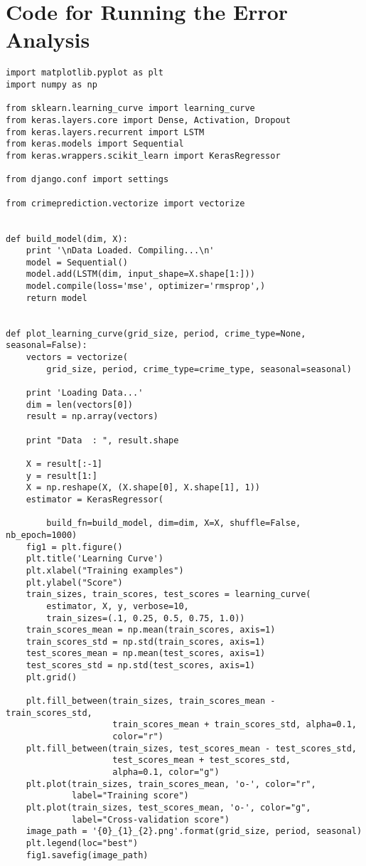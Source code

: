 \chapter{Code for Running the Error Analysis} \label{code-error-analysis}
\begin{small}
\begin{verbatim}
import matplotlib.pyplot as plt
import numpy as np

from sklearn.learning_curve import learning_curve
from keras.layers.core import Dense, Activation, Dropout
from keras.layers.recurrent import LSTM
from keras.models import Sequential
from keras.wrappers.scikit_learn import KerasRegressor

from django.conf import settings

from crimeprediction.vectorize import vectorize


def build_model(dim, X):
    print '\nData Loaded. Compiling...\n'
    model = Sequential()
    model.add(LSTM(dim, input_shape=X.shape[1:]))
    model.compile(loss='mse', optimizer='rmsprop',)
    return model


def plot_learning_curve(grid_size, period, crime_type=None, seasonal=False):
    vectors = vectorize(
        grid_size, period, crime_type=crime_type, seasonal=seasonal)

    print 'Loading Data...'
    dim = len(vectors[0])
    result = np.array(vectors)

    print "Data  : ", result.shape

    X = result[:-1]
    y = result[1:]
    X = np.reshape(X, (X.shape[0], X.shape[1], 1))
    estimator = KerasRegressor(

        build_fn=build_model, dim=dim, X=X, shuffle=False, nb_epoch=1000)
    fig1 = plt.figure()
    plt.title('Learning Curve')
    plt.xlabel("Training examples")
    plt.ylabel("Score")
    train_sizes, train_scores, test_scores = learning_curve(
        estimator, X, y, verbose=10,
        train_sizes=(.1, 0.25, 0.5, 0.75, 1.0))
    train_scores_mean = np.mean(train_scores, axis=1)
    train_scores_std = np.std(train_scores, axis=1)
    test_scores_mean = np.mean(test_scores, axis=1)
    test_scores_std = np.std(test_scores, axis=1)
    plt.grid()

    plt.fill_between(train_sizes, train_scores_mean - train_scores_std,
                     train_scores_mean + train_scores_std, alpha=0.1,
                     color="r")
    plt.fill_between(train_sizes, test_scores_mean - test_scores_std,
                     test_scores_mean + test_scores_std,
                     alpha=0.1, color="g")
    plt.plot(train_sizes, train_scores_mean, 'o-', color="r",
             label="Training score")
    plt.plot(train_sizes, test_scores_mean, 'o-', color="g",
             label="Cross-validation score")
    image_path = '{0}_{1}_{2}.png'.format(grid_size, period, seasonal)
    plt.legend(loc="best")
    fig1.savefig(image_path)
\end{verbatim}
\end{small}